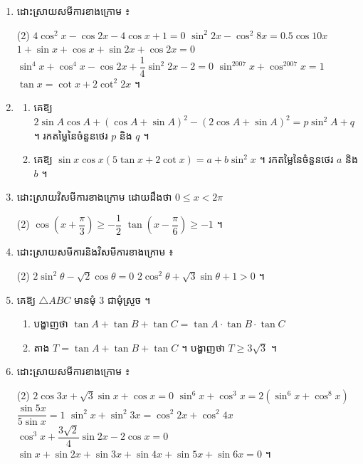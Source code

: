 \begin{enumerate}[1]
\begin{tasks}
  \end{tasks}
  \item ដោះស្រាយសមីការខាងក្រោម ៖
  \begin{tasks}(2)
    \task $4\cos^2 x - \cos 2x - 4\cos x + 1 = 0$
    \task $\sin^2 2x - \cos^2 8x = 0.5\cos 10x$
    \task $1 + \sin x + \cos x + \sin 2x + \cos 2x = 0$
    \task $\sin^4 x + \cos^4 x - \cos 2x + \dfrac{1}{4}\sin^2 2x - 2 = 0$
    \task $\sin^{2007} x + \cos^{2007} x = 1$
    \task $\tan x = \cot x + 2\cot^2 2x$ ។
  \end{tasks}
  \item
  \begin{enumerate}[a]
    \item គេឱ្យ $2\sin A\cos A + (\cos A + \sin A)^2 - (2\cos A + \sin A)^2 = p\sin^2 A + q$ ។ រកតម្លៃនៃចំនួនថេរ $p$ និង $q$ ។
    \item គេឱ្យ $\sin x\cos x(5\tan x + 2\cot x) = a + b\sin^2 x$ ។ រកតម្លៃនៃចំនួនថេរ $a$ និង $b$ ។
  \end{enumerate}
  \item ដោះស្រាយវិសមីការខាងក្រោម ដោយដឹងថា $0 \le x < 2\pi$
  \begin{tasks}(2)
    \task $\cos\left(x + \dfrac{\pi}{3}\right) \ge -\dfrac{1}{2}$
    \task $\tan\left(x - \dfrac{\pi}{6}\right) \ge -1$ ។
  \end{tasks}
  \item ដោះស្រាយសមីការនិងវិសមីការខាងក្រោម ៖
  \begin{tasks}(2)
    \task $2\sin^2\theta - \sqrt{2}\cos\theta = 0$
    \task $2\cos^2\theta + \sqrt{3}\sin\theta + 1 > 0$ ។
  \end{tasks}
  \item គេឱ្យ $\triangle ABC$ មានមុំ $3$ ជាមុំស្រួច ។
  \begin{enumerate}[a]
    \item បង្ហាញថា $\tan A + \tan B + \tan C = \tan A \cdot \tan B \cdot \tan C$
    \item តាង $T = \tan A + \tan B + \tan C$ ។ បង្ហាញថា $T \ge 3\sqrt{3}$ ។
  \end{enumerate}
  \item ដោះស្រាយសមីការខាងក្រោម ៖
  \begin{tasks}(2)
    \task $2\cos 3x + \sqrt{3}\sin x + \cos x = 0$
    \task $\sin^6 x + \cos^3 x = 2(\sin^6 x + \cos^8 x)$
    \task $\dfrac{\sin 5x}{5\sin x} = 1$
    \task $\sin^2 x + \sin^2 3x = \cos^2 2x + \cos^2 4x$
    \task $\cos^3 x + \dfrac{3\sqrt{2}}{4}\sin 2x - 2\cos x = 0$
    \task $\sin x + \sin 2x + \sin 3x + \sin 4x + \sin 5x + \sin 6x = 0$ ។

\end{tasks}
\end{enumerate}
